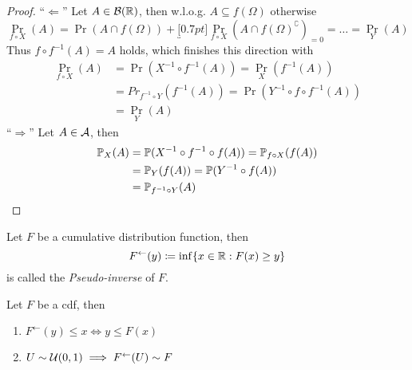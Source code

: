 \begin{proof}
    ``\(\Leftarrow\)'' Let \(A\in\cB(\R)\), then w.l.o.g. \(A\subseteq f(\Omega)\) otherwise
    \[
        \Pr_{f\circ X}(A)=\Pr(A\cap f(\Omega))+\underbracket[0.7pt]{
            \Pr_{f\circ X}(A\cap f(\Omega)^\complement)
            }_{=0}=\dotsc=\Pr_Y(A) 
    \]
    Thus \(f\circ f^{-1}(A)=A\) holds, which finishes this direction with
    \begin{align*}
        \Pr_{f\circ X}(A)
        &=\Pr(X^{-1}\circ f^{-1}(A))=\Pr_X(f^{-1}(A))\\
        &=Pr_{f^{-1}\circ Y}(f^{-1}(A))=\Pr(Y^{-1}\circ f\circ f^{-1}(A))\\
        &=\Pr_Y(A)
    \end{align*}
    ``\(\Rightarrow\)'' Let \(A\in\cA\), then
    \begin{align*}
        \Pr_X(A)&=\Pr(X^{-1}\circ f^{-1}\circ f(A))=\Pr_{f\circ X}(f(A))\\
        &=\Pr_Y(f(A))=\Pr(Y^{-1}\circ f(A))\\
        &=\Pr_{f^{-1}\circ Y}(A) \qedhere
    \end{align*}
\end{proof}
\begin{definition}\label{appx3}
    Let \(F\) be a cumulative distribution function, then 
    \[F^\leftarrow (y) \coloneqq \inf\{x\in\R : F(x)\ge y \}\]
    is called the \emph{Pseudo-inverse} of \(F\).
\end{definition}
\begin{lemma}\label{appx pseudo inv distribution}
    Let \(F\) be a cdf, then
    \begin{enumerate}[label=(\roman*), font=\normalfont]
        \item\label{appx3:i} \(
            F^\leftarrow (y)\le x \iff y \le F(x)
        \)
        \item\label{appx3:ii} \(U\sim\cU(0,1) \implies F^\leftarrow(U) \sim F \)
    \end{enumerate}
\end{lemma}

